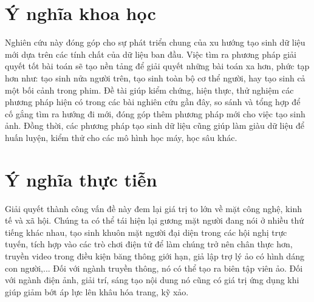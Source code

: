 \section{\texorpdfstring{Ý nghĩa khoa học}{ScientificMeaning}}
Nghiên cứu này đóng góp cho sự phát triển chung của xu hướng tạo sinh dữ liệu mới dựa trên các tính chất của dữ liệu ban đầu. Việc tìm ra phương pháp giải quyết tốt bài toán sẽ tạo nền tảng để giải quyết những bài toán xa hơn, phức tạp hơn như: tạo sinh nửa người trên, tạo sinh toàn bộ cơ thể người, hay tạo sinh cả một bối cảnh trong phim. Đề tài giúp kiểm chứng, hiện thực, thử nghiệm các phương pháp hiện có trong các bài nghiên cứu gần đây, so sánh và tổng hợp để cố gắng tìm ra hướng đi mới, đóng góp thêm phương pháp mới cho việc tạo sinh ảnh. Đồng thời, các phương pháp tạo sinh dữ liệu cũng giúp làm giàu dữ liệu để huấn luyện, kiểm thử cho các mô hình học máy, học sâu khác.

\section{\texorpdfstring{Ý nghĩa thực tiễn}{RealLifeMeaning}}
Giải quyết thành công vấn đề này đem lại giá trị to lớn về mặt công nghệ, kinh tế và xã hội. Chúng ta có thể tái hiện lại gương mặt người đang nói ở nhiều thứ tiếng khác nhau, tạo sinh khuôn mặt người đại diện trong các hội nghị trực tuyến, tích hợp vào các trò chơi điện tử để làm chúng trở nên chân thực hơn, truyền video trong điều kiện băng thông giới hạn, giả lập trợ lý ảo có hình dáng con người,... Đối với ngành truyền thông, nó có thể tạo ra biên tập viên ảo. Đối với ngành điện ảnh, giải trí, sáng tạo nội dung nó cũng có giá trị ứng dụng khi giúp giảm bớt áp lực lên khâu hóa trang, kỹ xảo.
